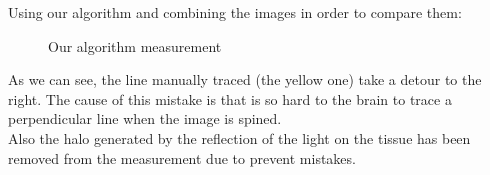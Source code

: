 Using our algorithm and combining the images in order to compare them:

    \begin{figure}[H]
      \caption{Our algorithm measurement}
      \centering \setlength\fboxsep{0pt} \setlength\fboxrule{0.5pt}
    \end{figure}

As we can see, the line manually traced (the yellow one) take a detour
to the right. The cause of this mistake is that is so hard to the brain
to trace a perpendicular line when the image is spined. \\
Also the halo generated by the reflection of the light on the tissue
has been removed from the measurement due to prevent mistakes.
